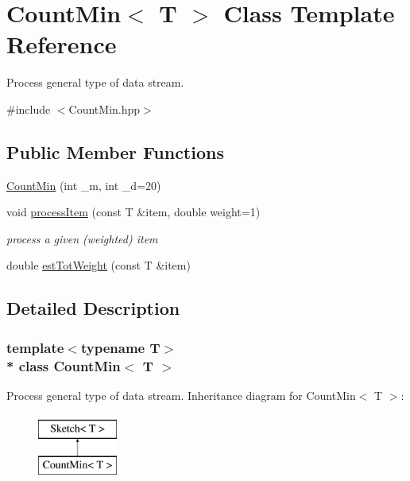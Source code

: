 \hypertarget{classCountMin}{}\section{Count\+Min$<$ T $>$ Class Template Reference}
\label{classCountMin}


Process general type of data stream.  




{\ttfamily \#include $<$Count\+Min.\+hpp$>$}

\subsection*{Public Member Functions}
\begin{DoxyCompactItemize}
\item 
\hyperlink{classCountMin_aece65a6967ad83ebe550d1559a09d0b1}{Count\+Min} (int \+\_\+m, int \+\_\+d=20)
\item 
void \hyperlink{classCountMin_a674f3b831f782fa8ac2daf335a237946}{process\+Item} (const T \&item, double weight=1)\hypertarget{classCountMin_a674f3b831f782fa8ac2daf335a237946}{}\label{classCountMin_a674f3b831f782fa8ac2daf335a237946}

\begin{DoxyCompactList}\small\item\em process a given (weighted) item \end{DoxyCompactList}\item 
double \hyperlink{classCountMin_ae4f0d164f8ee77ecbf65fc83f4d8ac71}{est\+Tot\+Weight} (const T \&item)
\end{DoxyCompactItemize}


\subsection{Detailed Description}
\subsubsection*{template$<$typename T$>$\\*
class Count\+Min$<$ T $>$}

Process general type of data stream. Inheritance diagram for Count\+Min$<$ T $>$\+:\begin{figure}[H]
\begin{center}
\leavevmode
\includegraphics[height=2.000000cm]{classCountMin}
\end{center}
\end{figure}


